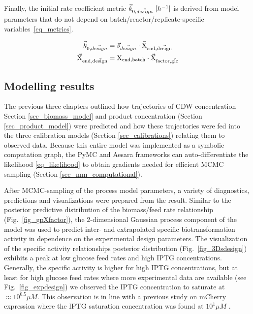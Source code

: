 \documentclass[sn-standardnature]{sn-jnl}%
\def\vec{\mathaccent "017E\relax }
\theoremstyle{thmstyleone}%
\theoremstyle{thmstyletwo}%
\theoremstyle{thmstylethree}%
\begin{document}
Finally, the initial rate coefficient metric $\vec{k}_{0,\vec{design}}\ [h^{-1}]$ is derived from model parameters that do not depend on batch/reactor/replicate-specific variables~\eqref{eq_metrics}.

\begin{equation}
\begin{aligned}
    \vec{k}_{0,\vec{design}} &= \vec{s}_{\vec{design}} \cdot \mathrm{\vec{X}_{end,\vec{design}}} \\
    \mathrm{\vec{X}_{end,\vec{design}}} &= \mathrm{X_{end,batch}} \cdot \mathrm{\vec{X}_{factor,\vec{glc}}}
\end{aligned}
\label{eq_metrics}
\end{equation}


\subsection{Modelling results}
The previous three chapters outlined how trajectories of CDW concentration Section \ref{sec_biomass_model} and product concentration (Section \ref{sec_product_model}) were predicted and how these trajectories were fed into the three calibration models (Section \ref{sec_calibrations}) relating them to observed data.
Because this entire model was implemented as a symbolic computation graph, the PyMC and Aesara frameworks can auto-differentiate the likelihood \eqref{eq_likelihood} to obtain gradients needed for efficient MCMC sampling (Section \ref{sec_mm_computational}).

After MCMC-sampling of the process model parameters, a variety of diagnostics, predictions and visualizations were prepared from the result.
Similar to the posterior predictive distribution of the biomass/feed rate relationship (Fig.~\ref{fig_gpXfactor}), the 2-dimensional Gaussian process component of the model was used to predict inter- and extrapolated specific biotransformation activity in dependence on the experimental design parameters.
The visualization of the specific activity relationships posterior distribution (Fig.~\ref{fig_3Dsdesign}) exhibits a peak at low glucose feed rates and high IPTG concentrations.
Generally, the specific activity is higher for high IPTG concentrations, but at least for high glucose feed rates where more experimental data are available (see Fig.~\ref{fig_expdesign}) we observed the IPTG concentration to saturate at $\approx 10^{0.5} \mu M$.
This observation is in line with a previous study on mCherry expression where the IPTG saturation concentration was found at $10^1 \mu M$ \cite{von2021automated}.
\end{document}
